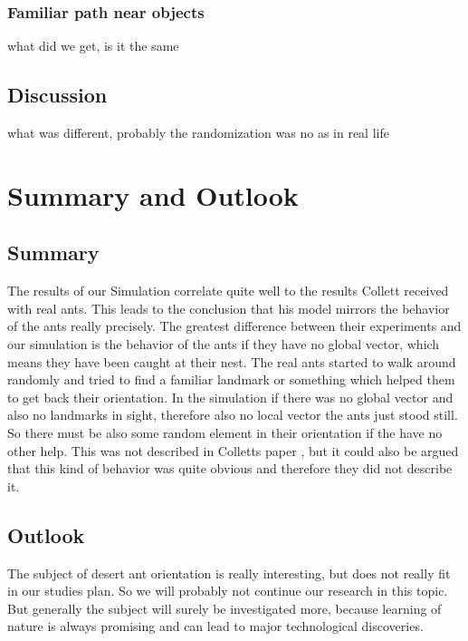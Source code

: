 \documentclass[11pt]{article}
\begin{document}
		\subsubsection{Familiar path near objects}




		what did we get, is it the same
	\subsection{Discussion}
		what was different, probably the randomization was no as in real life
\section{Summary and Outlook} %
	\subsection{Summary}
		The results of our Simulation correlate quite well to the results Collett received with real ants. This leads to the conclusion that his model mirrors the behavior of the ants really precisely. The greatest difference between their experiments and our simulation is the behavior of the ants if they have no global vector, which means they have been caught at their nest. The real ants started to walk around randomly and tried to find a familiar landmark or something which helped them to get back their orientation. In the simulation if there was no global vector and also no landmarks in sight, therefore also no local vector the ants just stood still. So there must be also some random element in their orientation if the have no other help. This was not described in Colletts paper \cite{wehner}, but it could also be argued that this kind of behavior was quite obvious and therefore they did not describe it.
	\subsection{Outlook}
		The subject of desert ant orientation is really interesting, but does not really fit in our studies plan. So we will probably not continue our research in this topic. But generally the subject will surely be investigated more, because learning of nature is always promising and can lead to major technological discoveries.

\end{document}
